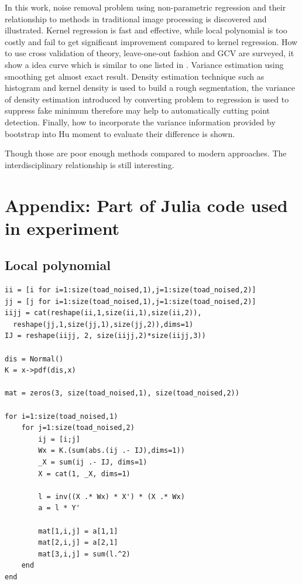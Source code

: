 \documentclass{article}
\begin{document}
In this work, noise removal problem using non-parametric regression and their relationship to methods in traditional image processing 
is discovered and illustrated. Kernel regression is fast and effective, while local polynomial is too costly and fail to get significant
improvement compared to kernel regression. How to use cross validation of theory, leave-one-out fashion and GCV are surveyed, it show
a idea curve which is similar to one listed in \cite{wasserman2006all}. Variance estimation using smoothing get almost exact result. Density estimation
technique such as histogram and kernel density is used to build a rough segmentation, the variance of density estimation introduced by
converting problem to regression is used to suppress fake minimum therefore may help to automatically cutting point detection. Finally, 
how to incorporate the variance information provided by bootstrap into Hu moment to evaluate their difference is shown.

Though those are poor enough methods compared to modern approaches. The interdisciplinary relationship is still interesting. 


  

\appendix

\section{Appendix: Part of Julia code used in experiment}


\subsection{Local polynomial}

\begin{lstlisting}
ii = [i for i=1:size(toad_noised,1),j=1:size(toad_noised,2)] 
jj = [j for i=1:size(toad_noised,1),j=1:size(toad_noised,2)] 
iijj = cat(reshape(ii,1,size(ii,1),size(ii,2)),
  reshape(jj,1,size(jj,1),size(jj,2)),dims=1)
IJ = reshape(iijj, 2, size(iijj,2)*size(iijj,3))

dis = Normal()
K = x->pdf(dis,x)

mat = zeros(3, size(toad_noised,1), size(toad_noised,2))

for i=1:size(toad_noised,1)
    for j=1:size(toad_noised,2)
        ij = [i;j]
        Wx = K.(sum(abs.(ij .- IJ),dims=1))
        _X = sum(ij .- IJ, dims=1)
        X = cat(1, _X, dims=1)

        l = inv((X .* Wx) * X') * (X .* Wx)
        a = l * Y'

        mat[1,i,j] = a[1,1]
        mat[2,i,j] = a[2,1]
        mat[3,i,j] = sum(l.^2)
    end
end
\end{lstlisting}
\end{document}

